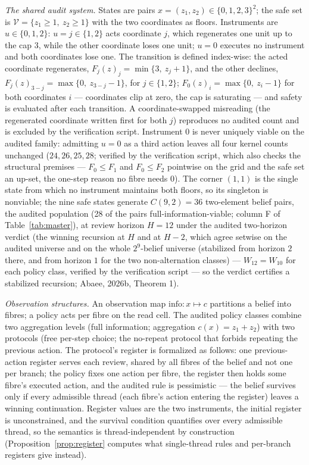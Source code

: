 \documentclass[10pt,twocolumn]{article}
\theoremstyle{definition}
\begin{document}
\emph{The shared audit system.} States are pairs
\(x = (z_1, z_2) \in \{0,1,2,3\}^{2}\); the safe set is
\(\mathcal{V} = \{z_1 \ge 1,\ z_2 \ge 1\}\) with the two coordinates as
floors. Instruments are \(u \in \{0, 1, 2\}\): \(u = j \in \{1,2\}\)
acts coordinate \(j\), which regenerates one unit up to the cap \(3\),
while the other coordinate loses one unit; \(u = 0\) executes no
instrument and both coordinates lose one. The transition is defined index-wise: the acted coordinate regenerates, \(F_j(z)_j = \min\{3,\ z_j + 1\}\), and the other declines, \(F_j(z)_{3-j} = \max\{0,\ z_{3-j} - 1\}\), for \(j \in \{1,2\}\); \(F_0(z)_i = \max\{0,\ z_i - 1\}\) for both coordinates \(i\) --- coordinates clip at zero, the cap is saturating --- and safety is evaluated after each transition. A coordinate-swapped misreading (the regenerated coordinate written first for both \(j\)) reproduces no audited count and is excluded by the verification script. Instrument \(0\) is never uniquely viable on the audited family: admitting \(u = 0\) as a third action leaves all four kernel counts unchanged (\(24, 26, 25, 28\); verified by the verification script, which also checks the structural premises --- \(F_0 \le F_1\) and \(F_0 \le F_2\) pointwise on the grid and the safe set an up-set, the one-step reason no fibre needs \(0\)). The corner \((1,1)\) is the
single state from which no instrument maintains both floors, so its
singleton is nonviable; the nine safe states generate
\(C(9,2) = 36\) two-element belief pairs, the audited population (28 of the pairs full-information-viable; column F of Table~\ref{tab:master}), at review horizon \(H = 12\) under the audited two-horizon verdict (the winning recursion at \(H\) and at \(H - 2\), which agree setwise on the audited universe and on the whole \(2^9\)-belief universe (stabilized from horizon \(2\) there, and from horizon \(1\) for the two non-alternation classes) --- \(W_{12} = W_{10}\) for each policy class, verified by the verification script --- so the verdict certifies a stabilized recursion; Abaee, 2026b, Theorem 1).

\emph{Observation structures.} An observation map
\(\mathrm{info}: x \mapsto c\) partitions a belief into fibres; a policy
acts per fibre on the read cell. The audited policy classes combine two
aggregation levels (full information; aggregation
\(c(x) = z_1 + z_2\)) with two protocols (free per-step choice; the
no-repeat protocol that forbids repeating the previous action. The
protocol's register is formalized as follows: one previous-action register
serves each review, shared by all fibres of the belief and not one per
branch; the policy fixes one action per fibre, the register then holds
some fibre's executed action, and the audited rule is pessimistic --- the
belief survives only if every admissible thread (each fibre's action
entering the register) leaves a winning continuation. Register values are
the two instruments, the initial register is unconstrained, and the survival condition quantifies over every
admissible thread, so the semantics is thread-independent by
construction (Proposition~\ref{prop:register} computes what
single-thread rules and per-branch registers give instead).
\end{document}

